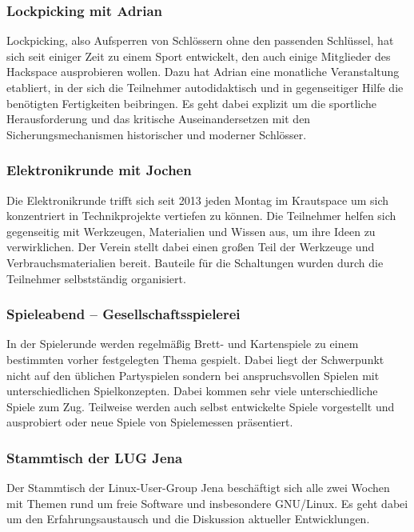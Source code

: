 \documentclass[10pt,DIV16]{scrartcl}
\begin{document}
\subsubsection{Lockpicking mit Adrian}

Lockpicking, also Aufsperren von Schlössern ohne den passenden
Schlüssel, hat sich seit einiger Zeit zu einem Sport entwickelt, den
auch einige Mitglieder des Hackspace ausprobieren wollen. Dazu hat
Adrian eine monatliche Veranstaltung etabliert, in der sich die Teilnehmer
autodidaktisch und in gegenseitiger Hilfe die benötigten Fertigkeiten
beibringen. Es geht dabei explizit um die sportliche Herausforderung
und das kritische Auseinandersetzen mit den Sicherungsmechanismen
historischer und moderner Schlösser.

\subsubsection{Elektronikrunde mit Jochen}

Die Elektronikrunde trifft sich seit 2013 jeden Montag im Krautspace um
sich konzentriert in Technikprojekte vertiefen zu können. Die
Teilnehmer helfen sich gegenseitig mit Werkzeugen, Materialien und
Wissen aus, um ihre Ideen zu verwirklichen. Der Verein stellt dabei
einen großen Teil der Werkzeuge und Verbrauchsmaterialien bereit.
Bauteile für die Schaltungen wurden durch die Teilnehmer selbstständig
organisiert.

\subsubsection{Spieleabend -- Gesellschaftsspielerei}

In der Spielerunde werden regelmäßig Brett- und Kartenspiele zu einem
bestimmten vorher festgelegten Thema gespielt. Dabei liegt der Schwerpunkt
nicht auf den üblichen Partyspielen sondern bei anspruchsvollen Spielen mit
unterschiedlichen Spielkonzepten. Dabei kommen sehr viele unterschiedliche
Spiele zum Zug. Teilweise werden auch selbst entwickelte Spiele vorgestellt
und ausprobiert oder neue Spiele von Spielemessen präsentiert.

\subsubsection{Stammtisch der LUG Jena}

Der Stammtisch der Linux-User-Group Jena beschäftigt sich alle zwei Wochen
mit Themen rund um freie Software und insbesondere GNU/Linux. Es geht dabei
um den Erfahrungsaustausch und die Diskussion aktueller Entwicklungen.
\end{document}
